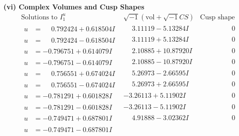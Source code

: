 \documentclass[1p]{elsarticle_modified}
\theoremstyle{definition}
\newcommand{\I}{\sqrt{-1}}
\begin{document}
\newpage\flushleft \textbf{(vi) Complex Volumes and Cusp Shapes}
$$\begin{array}{c|c|c}  
\text{Solutions to }I^u_{1}& \I (\text{vol} + \sqrt{-1}CS) & \text{Cusp shape}\\
 \hline 
\begin{aligned}
u &= \phantom{-}0.792424 + 0.618504 I\end{aligned}
 & \phantom{-}3.11119 - 5.13284 I & \phantom{-0.000000 } 0 \\ \hline\begin{aligned}
u &= \phantom{-}0.792424 - 0.618504 I\end{aligned}
 & \phantom{-}3.11119 + 5.13284 I & \phantom{-0.000000 } 0 \\ \hline\begin{aligned}
u &= -0.796751 + 0.614079 I\end{aligned}
 & \phantom{-}2.10885 + 10.87920 I & \phantom{-0.000000 } 0 \\ \hline\begin{aligned}
u &= -0.796751 - 0.614079 I\end{aligned}
 & \phantom{-}2.10885 - 10.87920 I & \phantom{-0.000000 } 0 \\ \hline\begin{aligned}
u &= \phantom{-}0.756551 + 0.674024 I\end{aligned}
 & \phantom{-}5.26973 - 2.66595 I & \phantom{-0.000000 } 0 \\ \hline\begin{aligned}
u &= \phantom{-}0.756551 - 0.674024 I\end{aligned}
 & \phantom{-}5.26973 + 2.66595 I & \phantom{-0.000000 } 0 \\ \hline\begin{aligned}
u &= -0.781291 + 0.601828 I\end{aligned}
 & -3.26113 + 5.11902 I & \phantom{-0.000000 } 0 \\ \hline\begin{aligned}
u &= -0.781291 - 0.601828 I\end{aligned}
 & -3.26113 - 5.11902 I & \phantom{-0.000000 } 0 \\ \hline\begin{aligned}
u &= -0.749471 + 0.687801 I\end{aligned}
 & \phantom{-}4.91888 - 3.02362 I & \phantom{-0.000000 } 0 \\ \hline\begin{aligned}
u &= -0.749471 - 0.687801 I\end{aligned}

\end{array}$$
\end{document}
